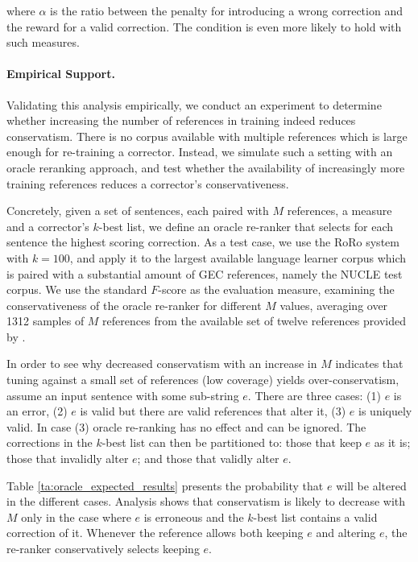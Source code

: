 \documentclass[letterpaper, 11pt]{article}
\begin{document}
\noindent
where $\alpha$ is the ratio between the penalty for introducing a wrong correction and the reward for a valid correction. The condition is even more likely to hold with such measures.

\paragraph{Empirical Support.}
Validating this analysis empirically, we conduct an experiment to determine whether increasing
the number of references in training indeed reduces conservatism. There is no 
corpus available with multiple references which is large enough for re-training a corrector. 
Instead, we simulate such a setting with an oracle reranking approach, and test whether the 
availability of increasingly more training references reduces a corrector's conservativeness.

Concretely, given a set of sentences, each paired with $M$ references, a measure and a 
corrector's $k$-best list, we define an oracle re-ranker that selects for each sentence the highest scoring correction.
As a test case, we use the RoRo system with $k=100$, and apply it to the 
largest available language learner corpus which is paired with a substantial amount of GEC references,
namely the NUCLE test corpus. We use the standard $F$-score as the evaluation measure,
examining the conservativeness of the oracle re-ranker for different $M$ values, averaging over 1312 samples of 
$M$ references from the available set of twelve references provided by \citet{bryant2015far}.

In order to see why decreased conservatism with an increase in $M$ indicates
that tuning against a small set of references (low coverage) yields over-conservatism, 
assume an input sentence with some sub-string $e$. 
There are three cases: (1) $e$ is an error, (2) $e$ is valid but there are valid references that alter it, (3) $e$ is uniquely valid. In case (3) oracle re-ranking has no effect and can be ignored.
The corrections in the $k$-best list can then be partitioned to: those that keep $e$ as it is; those that invalidly alter $e$; and those that validly alter $e$. 

Table \ref{ta:oracle_expected_results} presents the probability that $e$ will be altered in the different cases.
Analysis shows that conservatism is likely to decrease with $M$ only
  in the case where $e$ is erroneous and the $k$-best list contains a valid correction of it.
Whenever the reference allows both keeping $e$ and altering $e$, the re-ranker conservatively selects keeping $e$. 
\end{document}
